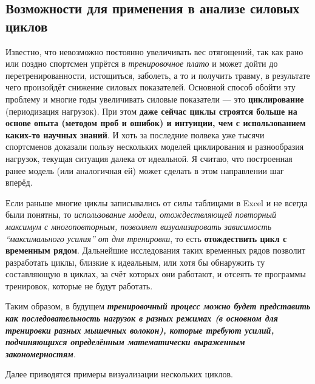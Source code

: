 \documentclass[
]{article}
\begin{document}
\hypertarget{ux432ux43eux437ux43cux43eux436ux43dux43eux441ux442ux438-ux434ux43bux44f-ux43fux440ux438ux43cux435ux43dux435ux43dux438ux44f-ux432-ux430ux43dux430ux43bux438ux437ux435-ux441ux438ux43bux43eux432ux44bux445-ux446ux438ux43aux43bux43eux432}{%
\subsection{Возможности для применения в анализе силовых
циклов}\label{ux432ux43eux437ux43cux43eux436ux43dux43eux441ux442ux438-ux434ux43bux44f-ux43fux440ux438ux43cux435ux43dux435ux43dux438ux44f-ux432-ux430ux43dux430ux43bux438ux437ux435-ux441ux438ux43bux43eux432ux44bux445-ux446ux438ux43aux43bux43eux432}}

Известно, что невозможно постоянно увеличивать вес отягощений, так как
рано или поздно спортсмен упрётся в \emph{тренировочное плато} и может
дойти до перетренированности, истощиться, заболеть, а то и получить
травму, в результате чего произойдёт снижение силовых показателей.
Основной способ обойти эту проблему и многие годы увеличивать силовые
показатели --- это \textbf{циклирование} (периодизация нагрузок). При
этом \textbf{даже сейчас циклы строятся больше на основе опыта (методом
проб и ошибок) и интуиции, чем с использованием каких-то научных
знаний}. И хоть за последние полвека уже тысячи спортсменов доказали
пользу нескольких моделей циклирования и разнообразия нагрузок, текущая
ситуация далека от идеальной. Я считаю, что построенная ранее модель
(или аналогичная ей) может сделать в этом направлении шаг вперёд.

Если раньше многие циклы записывались от силы таблицами в Excel и не
всегда были понятны, то \emph{использование модели, отождествляющей
повторный максимум с многоповторным, позволяет визуализировать
зависимость ``максимального усилия'' от дня тренировки}, то есть
\textbf{отождествить цикл с временным рядом}. Дальнейшие исследования
таких временных рядов позволит разработать циклы, близкие к идеальным,
или хотя бы обнаружить ту составляющую в циклах, за счёт которых они
работают, и отсеять те программы тренировок, которые не будут работать.

Таким образом, в будущем \textbf{\emph{тренировочный процесс можно будет
представить как последовательность нагрузок в разных режимах (в основном
для тренировки разных мышечных волокон), которые требуют усилий,
подчиняющихся определённым математически выраженным закономерностям}}.

Далее приводятся примеры визуализации нескольких циклов.
\end{document}
